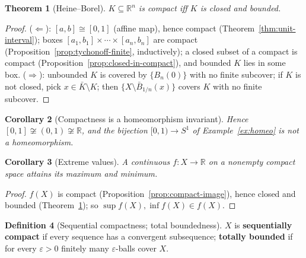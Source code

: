 \documentclass[11pt,a4paper]{article}
\newtheorem{theorem}{Theorem}[section]
\newtheorem{corollary}[theorem]{Corollary}
\theoremstyle{definition}
\newtheorem{definition}[theorem]{Definition}
\newcommand{\R}{\mathbb{R}}
\begin{document}
	\begin{theorem}[Heine--Borel]\label{thm:heine-borel}
		$K\subseteq\R^n$ is compact iff $K$ is closed and bounded.
	\end{theorem}
	\begin{proof}
		($\Leftarrow$): $[a,b]\cong[0,1]$ (affine map), hence compact (Theorem~\ref{thm:unit-interval}); boxes
		$[a_1,b_1]\times\cdots\times[a_n,b_n]$ are compact (Proposition~\ref{prop:tychonoff-finite}, inductively);
		a closed subset of a compact is compact (Proposition~\ref{prop:closed-in-compact}), and bounded $K$ lies in some box.
		($\Rightarrow$): unbounded $K$ is covered by $\{B_n(0)\}$ with no finite subcover; if $K$ is not closed,
		pick $x\in\bar K\setminus K$; then $\{X\setminus\bar B_{1/n}(x)\}$ covers $K$ with no finite subcover.
	\end{proof}
	
	\begin{corollary}[Compactness is a homeomorphism invariant]\label{cor:compact-invariant}
		Hence $[0,1]\not\cong(0,1)\not\cong\R$, and the bijection $[0,1)\to S^1$ of Example~\ref{ex:homeo} is not a homeomorphism.
	\end{corollary}
	
	\begin{corollary}[Extreme values]\label{cor:extreme}
		A continuous $f:X\to\R$ on a nonempty compact space attains its maximum and minimum.
	\end{corollary}
	\begin{proof}
		$f(X)$ is compact (Proposition~\ref{prop:compact-image}), hence closed and bounded (Theorem~\ref{thm:heine-borel}); so $\sup f(X),\inf f(X)\in f(X)$.
	\end{proof}
	
	\begin{definition}[Sequential compactness; total boundedness]
		$X$ is \textbf{sequentially compact} if every sequence has a convergent subsequence; \textbf{totally
			bounded} if for every $\varepsilon>0$ finitely many $\varepsilon$-balls cover $X$.
	\end{definition}
	
\end{document}
